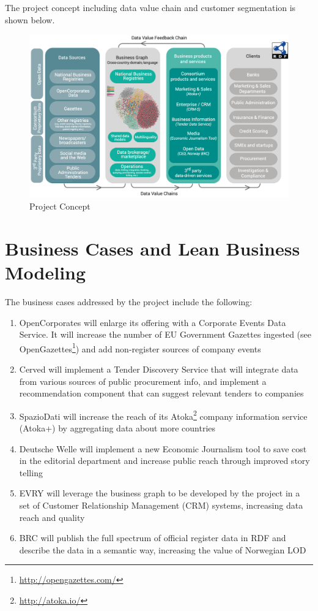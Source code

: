 \documentclass[runningheads,a4paper]{llncs}
\makeatletter
\def\maxwidth#1{\ifdim\Gin@nat@width>#1 #1\else\Gin@nat@width\fi}
\makeatother
\begin{document}
The project concept including data value chain and customer segmentation is shown below.
\begin{figure}[h!]
\centering
\includegraphics[width=\maxwidth{\textwidth}]{img/1000020100000497000002E2F043625FCAA4492F.png}
\cprotect\caption{Project Concept}
\label{}
\end{figure}


\section{Business Cases and Lean Business Modeling}

The business cases addressed by the project include the following:
\begin{enumerate}
\item OpenCorporates will enlarge its offering with a Corporate Events Data Service. It will increase the number of EU Government Gazettes ingested (see OpenGazettes\footnote{\url{http://opengazettes.com/}}) and add non-register sources of company events
\item Cerved will implement a Tender Discovery Service that will integrate data from various sources of public procurement info, and implement a recommendation component that can suggest relevant tenders to companies
\item SpazioDati will increase the reach of its Atoka\footnote{\url{http://atoka.io/}} company information service (Atoka+) by aggregating data about more countries
\item Deutsche Welle will implement a new Economic Journalism tool to save cost in the editorial department and increase public reach through improved story telling
\item EVRY will leverage the business graph to be developed by the project in a set of Customer Relationship Management (CRM) systems, increasing data reach and quality
\item BRC will publish the full spectrum of official register data in RDF and describe the data in a semantic way, increasing the value of Norwegian LOD
\end{enumerate}
\end{document}
